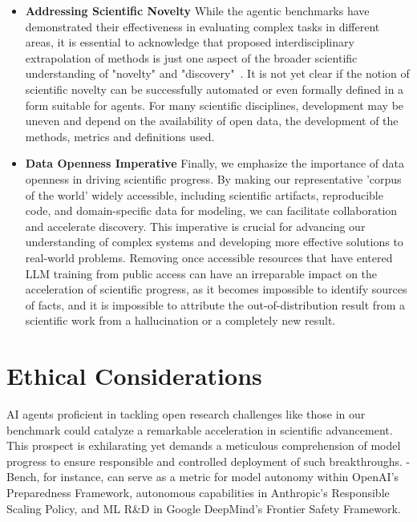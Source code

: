 \begin{itemize}
\item \textbf{Addressing Scientific Novelty}
While the agentic benchmarks have demonstrated their effectiveness in evaluating complex tasks in different areas, it is essential to acknowledge that proposed interdisciplinary extrapolation of methods is just one aspect of the broader scientific understanding of "novelty" and "discovery"~\citep{popper2005logic, langley1987scientific}. It is not yet clear if the notion of scientific novelty can be successfully automated or even formally defined in a form suitable for agents.
For many scientific disciplines, development may be uneven and depend on the availability of open data, the development of the methods, metrics and definitions used. 

\item \textbf{Data Openness Imperative}
Finally, we emphasize the importance of data openness in driving scientific progress. By making our representative 'corpus of the world' widely accessible, including scientific artifacts, reproducible code, and domain-specific data for modeling, we can facilitate collaboration and accelerate discovery. This imperative is crucial for advancing our understanding of complex systems and developing more effective solutions to real-world problems. Removing once accessible resources that have entered LLM training from public access can have an irreparable impact on the acceleration of scientific progress, as it becomes impossible to identify sources of facts, and it is impossible to attribute the out-of-distribution result from a scientific work from a hallucination or a completely new result.
\end{itemize}

\section{Ethical Considerations}
\label{sec:ethics}

AI agents proficient in tackling open research challenges like those in our benchmark could catalyze a remarkable acceleration in scientific advancement. This prospect is exhilarating yet demands a meticulous comprehension of model progress to ensure responsible and controlled deployment of such breakthroughs. \mlgym-Bench, for instance, can serve as a metric for model autonomy within OpenAI's Preparedness Framework, autonomous capabilities in Anthropic's Responsible Scaling Policy, and ML R\&D in Google DeepMind's Frontier Safety Framework.

